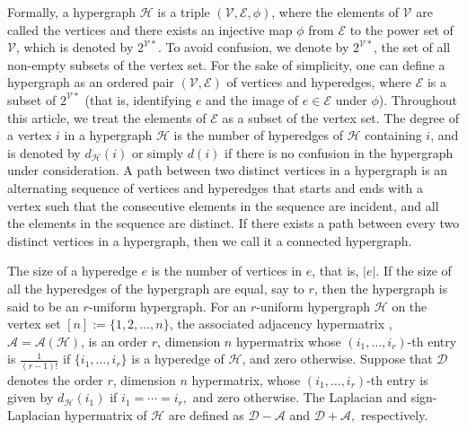 \documentclass[10pt,a4paper]{article}
\begin{document}
	Formally, a hypergraph $\mathcal{H}$ is a triple $(\mathcal{V}, \mathcal{E}, \phi)$, where the elements of $\mathcal{V}$ are called the vertices and there exists an injective map $\phi$ from $\mathcal{E}$ to the power set of $\mathcal{V}$, which is denoted by $2^{\mathcal{V}*}$. To avoid confusion, we denote by $2^{\mathcal{V}*}$, the set of all non-empty subsets of the vertex set.
	For the sake of simplicity, one can define a hypergraph as an ordered pair $(\mathcal{V}, \mathcal{E})$ of vertices and hyperedges, where  $\mathcal{E}$ is a subset of  $2^{\mathcal{V}*}$ (that is, identifying $e$ and the image of $e \in \mathcal{E}$ under $\phi$). Throughout this article, we treat the elements of $\mathcal{E}$ as a subset of the vertex set.
	The degree of a vertex $i$ in a hypergraph $\mathcal{H}$ is the number of hyperedges of $\mathcal{H}$ containing $i$, and is denoted by $d_{\mathcal{H}}(i)$ or simply $d(i)$ if there is no confusion in the hypergraph under consideration. A path between two distinct vertices in a hypergraph is an alternating sequence of vertices and hyperedges that starts and ends with a vertex such that the consecutive elements in the sequence are incident, and all the elements in the sequence are distinct. If there exists a path between every two distinct vertices in a hypergraph, then we call it a connected hypergraph.
	
	The size of a hyperedge $e$ is the number of vertices in $e$, that is, $|e|$. If the size of all the hyperedges of the hypergraph are equal, say to $r$, then the hypergraph is said to be an $r$-uniform hypergraph. For an $r$-uniform hypergraph $\mathcal{H}$ on the vertex set $[n]:=\{1,2,\ldots,n\}$, the associated adjacency hypermatrix \cite{cooper2012spectra}, $\mathcal{A}=\mathcal{A}(\mathcal{H})$, is an order $r$, dimension $n$ hypermatrix whose $(i_1,\ldots,i_r)$-th entry is $\frac{1}{(r-1)!} $ if $\{ i_1, \ldots, i_r\}$ is a hyperedge of $\mathcal{H}$, and zero otherwise. 
	Suppose that $\mathcal{D}$ denotes the order $r$, dimension $n$ hypermatrix, whose $(i_1, \ldots, i_r)$-th entry is given by $d_{\mathcal{H}}(i_1)$ if $i_1=\cdots = i_r,$ and zero otherwise. The Laplacian and sign-Laplacian hypermatrix of $\mathcal{H}$ are defined as $\mathcal{D}-\mathcal{A}$ and $\mathcal{D} + \mathcal{A},$ respectively.
	
	
\end{document}

